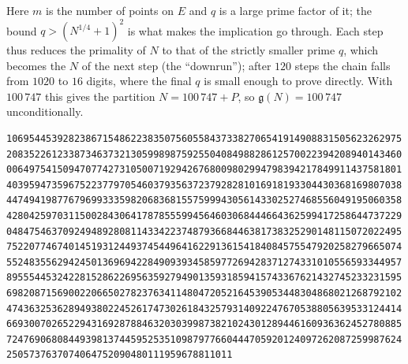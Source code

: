 \documentclass[11pt]{article}
\theoremstyle{plain}
\theoremstyle{definition}
\theoremstyle{remark}
\newcommand{\N}{N}
\newcommand{\g}{\mathfrak{g}}
\begin{document}
\smallskip
\noindent Here $m$ is the number of points on $E$ and $q$ is a large prime factor
of it; the bound $q>(N^{1/4}+1)^2$ is what makes the implication go through. Each
step thus reduces the primality of $N$ to that of the strictly smaller prime $q$,
which becomes the $N$ of the next step (the ``downrun''); after $120$ steps the
chain falls from $1020$ to $16$ digits, where the final $q$ is small enough to
prove directly. With $100\,747$ this gives the partition $\N=100\,747+P$, so
$\g(\N)=100\,747$ unconditionally.
\begin{verbatim}
1069544539282386715486223835075605584373382706541914908831505623262975
2083522612338734637321305998987592550408498828612570022394208940143460
0064975415094707742731050071929426768009802994798394217849911437581801
4039594735967522377970546037935637237928281016918193304430368169807038
4474941987767969933359820683681557599943056143302527468556049195060358
4280425970311500284306417878555994564603068444664362599417258644737229
0484754637092494892808114334223748793668446381738325290148115072022495
7522077467401451931244937454496416229136154184084575547920258279665074
5524835562942450136969422849093934585977269428371274331010556593344957
8955544532422815286226956359279490135931859415743367621432745233231595
6982087156900220665027823763411480472052164539053448304868021268792102
4743632536289493802245261747302618432579314092247670538805639533124414
6693007026522943169287884632030399873821024301289446160936362452780885
7247690680844939813744595253510987977660444705920124097262087259987624
2505737637074064752090480111959678811011
\end{verbatim}
\end{document}
